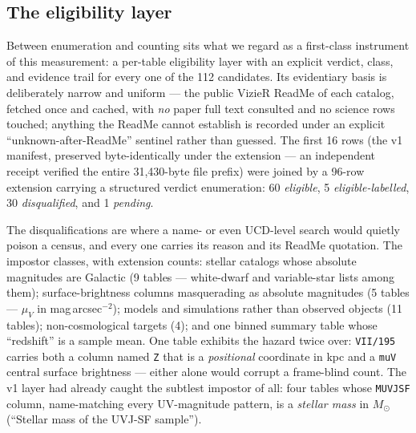 \documentclass[twocolumn]{aastex702}
\begin{document}
\subsection{The eligibility layer} \label{sec:eligibility}

Between enumeration and counting sits what we regard as a first-class instrument of
this measurement: a per-table eligibility layer with an explicit verdict, class, and
evidence trail for every one of the 112 candidates. Its evidentiary basis is
deliberately narrow and uniform --- the public VizieR ReadMe of each catalog, fetched
once and cached, with \emph{no} paper full text consulted and no science rows touched;
anything the ReadMe cannot establish is recorded under an explicit
``unknown-after-ReadMe'' sentinel rather than guessed. The first 16 rows (the v1
manifest, preserved byte-identically under the extension --- an independent receipt
verified the entire 31{,}430-byte file prefix) were joined by a 96-row extension
carrying a structured verdict enumeration: 60 \emph{eligible}, 5
\emph{eligible-labelled}, 30 \emph{disqualified}, and 1 \emph{pending}.

The disqualifications are where a name- or even UCD-level search would quietly poison a
census, and every one carries its reason and its ReadMe quotation. The impostor classes,
with extension counts: stellar catalogs whose absolute magnitudes are Galactic
(9 tables --- white-dwarf and variable-star lists among them); surface-brightness
columns masquerading as absolute magnitudes (5 tables --- $\mu_V$ in
mag\,arcsec$^{-2}$); models and simulations rather than observed objects (11 tables);
non-cosmological targets (4); and one binned summary table whose ``redshift'' is a
sample mean. One table exhibits the hazard twice over: \texttt{VII/195} carries both a
column named \texttt{Z} that is a \emph{positional} coordinate in kpc and a \texttt{muV}
central surface brightness --- either alone would corrupt a frame-blind count. The v1
layer had already caught the subtlest impostor of all: four tables whose
\texttt{MUVJSF} column, name-matching every UV-magnitude pattern, is a \emph{stellar
mass} in $M_\odot$ (``Stellar mass of the UVJ-SF sample'').
\end{document}
